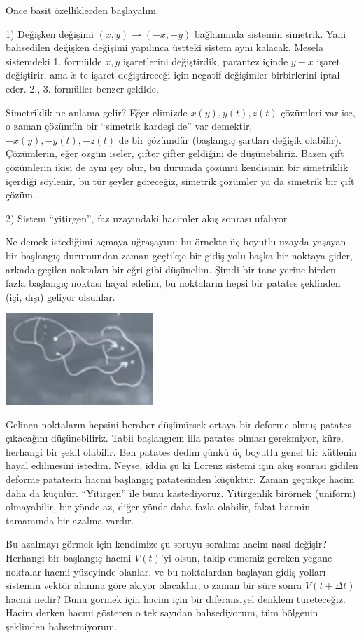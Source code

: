 \documentclass[12pt,fleqn]{article}\usepackage{../../common}
\begin{document}
Önce basit özelliklerden başlayalım. 

1) Değişken değişimi $(x,y) \to (-x,-y)$ bağlamında sistemin simetrik. Yani
bahsedilen değişken değişimi yapılınca üstteki sistem aynı kalacak. Mesela
sistemdeki 1. formülde $x,y$ işaretlerini değiştirdik, parantez içinde
$y-x$ işaret değiştirir, ama $\dot{x}$ te işaret değiştireceği için negatif
değişimler birbirlerini iptal eder. 2., 3. formüller benzer şekilde.

Simetriklik ne anlama gelir? Eğer elimizde $x(y),y(t),z(t)$ çözümleri var
ise, o zaman çözümün bir ``simetrik kardeşi de'' var demektir,
$-x(y),-y(t),-z(t)$ de bir çözümdür (başlangıç şartları değişik
olabilir). Çözümlerin, eğer özgün iseler, çifter çifter geldiğini de
düşünebiliriz. Bazen çift çözümlerin ikisi de aynı şey olur, bu durumda
çözümü kendisinin bir simetriklik içerdiği söylenir, bu tür şeyler
göreceğiz, simetrik çözümler ya da simetrik bir çift çözüm. 

2) Sistem ``yitirgen'', faz uzayındaki hacimler akış sonrası ufalıyor

Ne demek istediğimi açmaya uğraşayım: bu örnekte üç boyutlu uzayda yaşayan
bir başlangıç durumundan zaman geçtikçe bir gidiş yolu başka bir noktaya
gider, arkada geçilen noktaları bir eğri gibi düşünelim. Şimdi bir tane
yerine birden fazla başlangıç noktası hayal edelim, bu noktaların hepsi bir
patates şeklinden (içi, dışı) geliyor olsunlar.

\includegraphics[width=15em]{16_01.png}

Gelinen noktaların hepsini beraber düşünürsek ortaya bir deforme olmuş
patates çıkacağını düşünebiliriz. Tabii başlangıcın illa patates olması
gerekmiyor, küre, herhangi bir şekil olabilir. Ben patates dedim çünkü üç
boyutlu genel bir kütlenin hayal edilmesini istedim. Neyse, iddia şu ki
Lorenz sistemi için akış sonrası gidilen deforme patatesin hacmi başlangıç
patatesinden küçüktür. Zaman geçtikçe hacim daha da küçülür. ``Yitirgen''
ile bunu kastediyoruz. Yitirgenlik birörnek (uniform) olmayabilir, bir
yönde az, diğer yönde daha fazla olabilir, fakat hacmin tamamında bir
azalma vardır.

Bu azalmayı görmek için kendimize şu soruyu soralım: hacim nasıl değişir?
Herhangi bir başlangıç hacmi $V(t)$'yi olsun, takip etmemiz gereken yegane
noktalar hacmi yüzeyinde olanlar, ve bu noktalardan başlayan gidiş yolları
sistemin vektör alanına göre akıyor olacaklar, o zaman bir süre sonra
$V(t + \Delta t)$ hacmi nedir? Bunu görmek için hacim için bir diferansiyel
denklem türeteceğiz. Hacim derken hacmi gösteren o tek sayıdan
bahsediyorum, tüm bölgenin şeklinden bahsetmiyorum.
\end{document}
